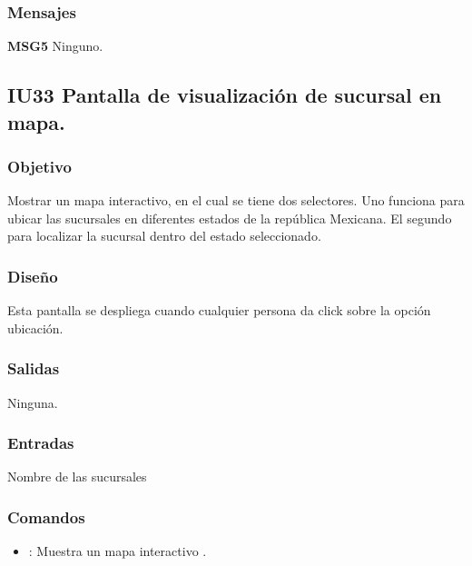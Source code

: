\subsubsection{Mensajes}
	\begin{Citemize}
		\item {\bf MSG5} Ninguno.
	\end{Citemize}
	

\subsection{IU33 Pantalla de visualización de sucursal en mapa.}

\subsubsection{Objetivo}
	Mostrar un mapa interactivo, en el cual se tiene dos selectores. Uno funciona para ubicar las sucursales en diferentes estados de la república Mexicana. El segundo para localizar la sucursal dentro del estado seleccionado.

\subsubsection{Diseño}
	Esta pantalla se despliega cuando cualquier persona da click sobre la opción ubicación.


\subsubsection{Salidas}

	Ninguna.

\subsubsection{Entradas}
Nombre de las sucursales

\subsubsection{Comandos}
\begin{itemize}
	\item {}: Muestra un mapa interactivo .
\end{itemize}

